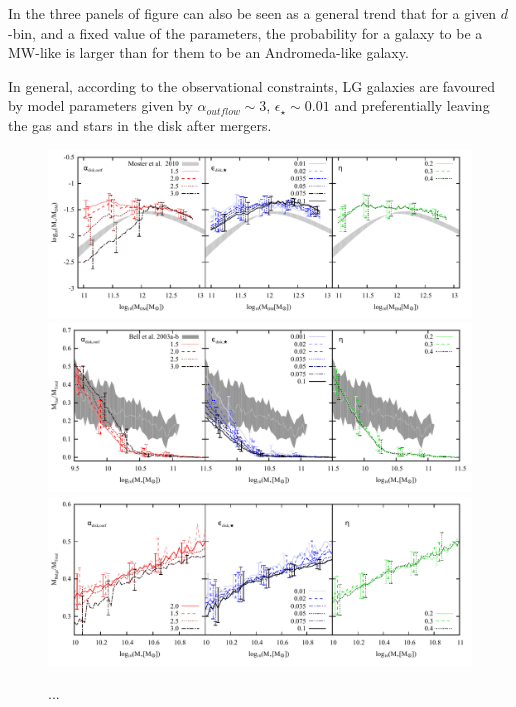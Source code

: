 \documentclass[useAMS,usenatbib]{mn2e}
\begin{document}
In the three panels of figure \label{fig:fded} can also be seen as a
general trend that for a given $d$-bin, and a fixed value of the
parameters, the probability for a galaxy to be a MW-like is larger than
for them to be an Andromeda-like galaxy.

In general, according to the observational constraints, LG galaxies
are favoured by model parameters given by $\alpha_{outflow} \sim 3$,
$\epsilon_{\star} \sim 0.01$ and preferentially leaving the gas and
stars in the disk after mergers.




\begin{figure}
 \includegraphics[scale=0.45,angle=0]{figures/runs/run-v1-13-multiplot-star-frac.pdf}
 \includegraphics[scale=0.45,angle=0]{figures/runs/run-v1-13-multiplot-gas.pdf}
 \includegraphics[scale=0.45,angle=0]{figures/runs/run-v1-13-multiplot-bulge.pdf}
\caption{...}
\label{fig:runs}
\end{figure}
\end{document}
